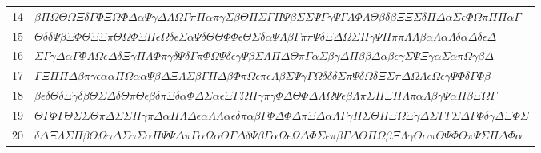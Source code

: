 \documentclass[11pt,a4paper]{article}
\begin{document}
\begin{boitecertificat}
{\begin{tabular}{@{}r l@{}}
14 & \textcolor{spectralargent}{$\beta\Pi\Omega\Theta\Omega\Xi\delta\Gamma\Phi\Xi\Omega\Phi\Delta\alpha\Psi\gamma\Delta\Lambda\Omega\Gamma\pi\Pi\alpha\pi\gamma\Sigma\beta\Theta\Pi\Sigma\Gamma\Pi\Psi\beta\Sigma\Sigma\Psi\Gamma\gamma\Psi\Gamma\Lambda\Phi\Lambda\Theta\beta\delta\beta\Xi\Xi\Sigma\delta\Pi\Delta\alpha\Sigma\epsilon\Phi\Omega\pi\Pi\Pi\alpha\Gamma$} \\
15 & \textcolor{spectralargent}{$\Theta\delta\delta\Psi\beta\Xi\Phi\Theta\Xi\Xi\pi\Theta\Omega\Phi\Xi\Pi\epsilon\Omega\delta\epsilon\Sigma\alpha\Psi\delta\Theta\Theta\Phi\Phi\epsilon\Theta\Sigma\delta\alpha\Psi\Lambda\beta\Gamma\pi\pi\Psi\delta\Xi\Delta\Omega\Sigma\Pi\gamma\Psi\Pi\pi\pi\Lambda\Lambda\beta\alpha\Lambda\alpha\Lambda\delta\alpha\Delta\delta\epsilon\Delta$} \\
16 & \textcolor{spectralargent}{$\Sigma\Gamma\gamma\Delta\alpha\Gamma\Phi\Lambda\Omega\epsilon\Delta\delta\Xi\gamma\Pi\Lambda\Phi\pi\gamma\delta\Psi\delta\Gamma\pi\Phi\Omega\Psi\delta\epsilon\gamma\Psi\beta\Sigma\Lambda\Pi\Delta\Theta\pi\Gamma\alpha\Sigma\beta\gamma\Delta\Pi\beta\beta\Delta\alpha\beta\epsilon\gamma\Sigma\Psi\Xi\gamma\alpha\Sigma\alpha\pi\Omega\gamma\beta\Delta$} \\
17 & \textcolor{spectralargent}{$\Gamma\Xi\Pi\Pi\Delta\beta\pi\gamma\epsilon\alpha\alpha\Pi\Omega\alpha\alpha\Psi\beta\Delta\Xi\Lambda\Sigma\beta\Gamma\Pi\Delta\beta\Phi\pi\Omega\epsilon\pi\epsilon\Lambda\beta\Sigma\Psi\gamma\Gamma\Omega\delta\delta\delta\Sigma\pi\Psi\delta\Omega\delta\Xi\Sigma\pi\Delta\Omega\Lambda\epsilon\Omega\epsilon\gamma\Psi\Phi\delta\Gamma\Phi\beta$} \\
18 & \textcolor{spectralargent}{$\beta\epsilon\delta\Theta\delta\Xi\gamma\delta\beta\Theta\Sigma\Delta\delta\Theta\pi\Theta\epsilon\beta\delta\pi\Xi\delta\alpha\Phi\Delta\Sigma\alpha\epsilon\Xi\Gamma\Omega\Pi\gamma\pi\gamma\Phi\Delta\Theta\Phi\Delta\Lambda\Omega\Psi\epsilon\beta\Lambda\pi\Sigma\Pi\Xi\Pi\Lambda\pi\alpha\Lambda\beta\gamma\Psi\alpha\Pi\beta\Xi\Omega\Gamma$} \\
19 & \textcolor{spectralargent}{$\Theta\Gamma\Phi\Gamma\Theta\Sigma\Sigma\Theta\pi\Delta\Sigma\Sigma\Pi\gamma\pi\Delta\alpha\Pi\Lambda\Delta\epsilon\alpha\Lambda\Lambda\alpha\epsilon\delta\pi\alpha\beta\Gamma\Phi\Delta\Phi\Delta\pi\Xi\Delta\alpha\Lambda\Gamma\gamma\Pi\Sigma\Theta\Pi\Xi\Omega\Xi\gamma\Delta\Sigma\Gamma\Gamma\Sigma\Delta\Gamma\Phi\delta\gamma\Delta\Xi\Phi\Sigma$} \\
20 & \textcolor{spectralargent}{$\delta\Delta\Xi\Lambda\Sigma\Pi\beta\Theta\Omega\gamma\Delta\Sigma\gamma\Sigma\alpha\Pi\Psi\Psi\Delta\pi\Gamma\alpha\Omega\alpha\Theta\Gamma\Delta\delta\Psi\beta\Gamma\alpha\Omega\epsilon\Omega\Delta\Phi\Sigma\epsilon\pi\beta\Gamma\Delta\Theta\Pi\Omega\beta\Xi\Lambda\gamma\Theta\alpha\pi\Theta\Psi\Phi\Theta\pi\Psi\Sigma\Pi\Delta\Phi\alpha$} \\

\end{tabular}}
\end{boitecertificat}
\end{document}
